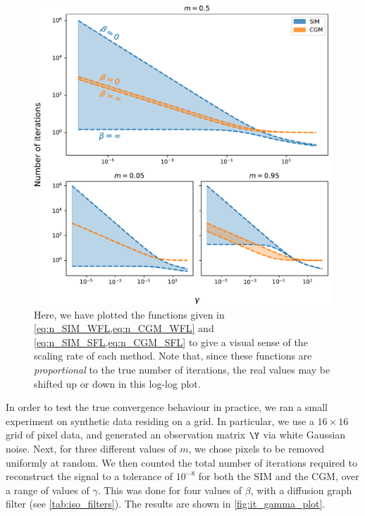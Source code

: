 \begin{figure}[hb]
    \begin{center} 
    \includegraphics[width=0.85\linewidth]{Figures/conv_SIM_CGM_compared.pdf}
    \end{center}
    \caption{\small{ Here, we have plotted the functions given in \cref{eq:n_SIM_WFL,eq:n_CGM_WFL} } and \cref{eq:n_SIM_SFL,eq:n_CGM_SFL} to give a visual sense of the scaling rate of each method. Note that, since these functions are \textit{proportional} to the true number of iterations, the real values may be shifted up or down in this log-log plot.}
    \label{fig:conv_SIM_CGM_compared}
\end{figure}

In order to test the true convergence behaviour in practice, we ran a small experiment on synthetic data residing on a grid. In particular, we use a $16 \times 16$ grid of pixel data, and generated an observation matrix $\Y$ via white Gaussian noise. Next, for three different values of $m$, we chose pixels to be removed uniformly at random. We then counted the total number of iterations required to reconstruct the signal to a tolerance of $10^{-8}$ for both the SIM and the CGM, over a range of values of $\gamma$. This was done for four values of $\beta$, with a diffusion graph filter (see \cref{tab:iso_filters}). The results are shown in \cref{fig:it_gamma_plot}. 

\vspace{0.5cm}

